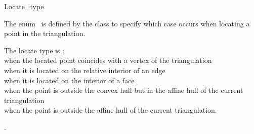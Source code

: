 
\ccModifierCrossRefOff
\begin{ccRefEnum}{Locate_type}  %


\ccDefinition
  
The enum \ccRefName\ is defined by the
class to specify
which case occurs when locating a point in the triangulation. 

{The locate type is : \\
 when the located point coincides 
with a vertex of the triangulation \\
 when it is located on the relative interior of an edge \\
 when it is located on the interior of a face  \\
 when the point
is  outside the convex hull but in the affine hull of the current triangulation \\
when the point is outside the affine hull
of the current triangulation.}

\ccSeeAlso
{}.

\end{ccRefEnum}
\ccModifierCrossRefOn




